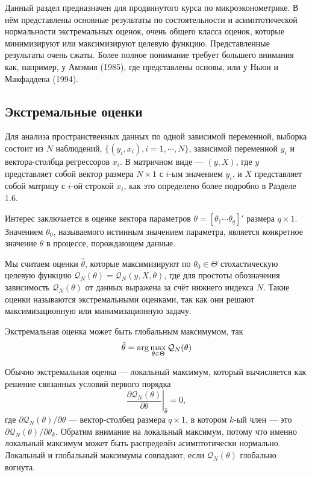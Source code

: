 Данный раздел предназначен для продвинутого курса по микроэконометрике. В нём представлены основные результаты по состоятельности и асимптотической нормальности экстремальных оценок, очень общего класса оценок, которые минимизируют или максимизируют целевую функцию. Представленные результаты очень сжаты. Более полное понимание требует большего внимания как, например, у Амэмия (1985), где представлены основы, или у Ньюи и Макфаддена (1994).

\subsection{Экстремальные оценки}

Для анализа пространственных данных по одной зависимой переменной, выборка состоит из $N$ наблюдений, 
$\{(y_i,x_i),i=1,\cdots,N\}$, зависимой переменной $y_i$ и вектора-столбца регрессоров $x_i$. 
В матричном виде --- $(y,X)$, где $y$ представляет собой вектор размера $N \times 1$ с $i$-ым значением $y_i$, и $X$ представляет собой матрицу с $i$-ой строкой $x_i$, как это определено более подробно в Разделе 1.6.

Интерес заключается в оценке вектора параметров $\theta=[\theta_1 \cdots \theta_q]'$ размера $q \times 1$. Значением $\theta_0$, называемого истинным значением параметра, является конкретное значение $\theta$ в процессе, порождающем данные.

Мы считаем оценки $\hat{\theta}$, которые максимизируют по $\theta_0 \in \Theta$ стохастическую целевую функцию $\mathcal{Q}_N(\theta)=\mathcal{Q}_N(y,X,\theta)$, где для простоты обозначения зависимость $\mathcal{Q}_N(\theta)$ от данных выражена за счёт нижнего индекса $N$. Такие оценки называются экстремальными оценками, так как они решают максимизационную или минимизационную задачу.

Экстремальная оценка может быть глобальным максимумом, так
\begin{equation}
\hat{\theta}= \arg\max _{\theta \in \Theta} \mathcal{Q}_N(\theta)
\end{equation}

Обычно  экстремальная оценка --- локальный максимум, который вычисляется как решение связанных условий первого порядка
\begin{equation}
\left. \frac{\partial \mathcal{Q}_N(\theta)}{\partial \theta} \right|_{\hat{\theta}}=0,
\end{equation}
где $\partial \mathcal{Q}_N(\theta)/ \partial \theta$ --- вектор-столбец размера $q \times 1$, в котором $k$-ый член --- это $\partial \mathcal{Q}_N(\theta)/ \partial \theta_k$. Обратим внимание на локальный максимум, потому что именно локальный максимум может быть распределён асимптотически нормально. Локальный и глобальный максимумы совпадают, если $\mathcal{Q}_N(\theta)$ глобально вогнута.


